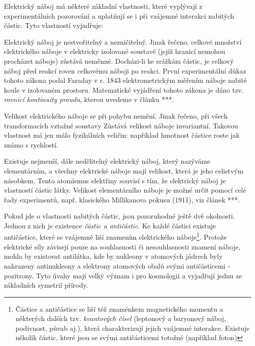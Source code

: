       Elektrický náboj má některé základní vlastnosti, které vyplývají z experimentálních pozorování
      a uplatňují se i při vzájemné interakci nabitých částic. Tyto vlastností vyjadřuje:    
      \begin{description}[leftmargin=2em,labelindent=1em, style=nextline]
        \item[Zákon zachování náboje] Elektrický náboj je nestvořitelný a nezničitelný. Jinak
              řečeno, celkové množství elektrického náboje v elektricky izolované soustavě (jejíž
              hranicí nemohou procházet náboje) zůstává neměnné. Docházi-li ke srážkám částic, je
              celkový náboj před reakcí roven celkovému náboji po reakci. První experimentální důkaz
              tohoto zákona podal Faraday v r. 1843 elektrometrickým měřením náboje nabité koule v
              izolovaném prostoru. Matematické vyjádření tohoto zákona je dáno tzv. \emph{rovnicí
              kontinuity proudu}, kterou uvedeme v článku ***. %
        \item[Zákon invariantnosti náboje] Velikost elektrického náboje se při pohybu nemění. Jinak
              řečeno, při všech transformacích vztažné soustavy Zůstává velikost náboje invariantní.
              Takovou vlastnost má jen málo fyzikálních veličin: například hmotnost částice roste
              jak známo s rychlostí.
        \item[Zákon kvantování náboje] Existuje nejmenší, dále nedělitelný elektrický náboj, který
              nazýváme elementárním, a všechny elektrické náboje mají velikost, která je jeho
              celistvým násobkem. Tento atomismus elektřiny souvisí s tím, že elektrický náboj je
              vlastností částic látky. Velikost elementárního náboje je možné určit pomocí celé řady
              experimentů, např. klasického Millikanova pokusu (1911), viz článek ***. %
      \end{description}

      Pokud jde o vlastnosti nabitých částic, jsou pozoruhodné ještě dvě okolnosti. Jednou z nich je
      existence \emph{částic a antičástic}. Ke každé částici existuje antičástice, které se vzájemně
      liší znamením elektrického náboje\footnote{Částice a antičástice se liší též znaménkem
      magnetického momentu a některých dalších tzv. \emph{kvantových čísel} (leptonový a  baryonový
      náboj, podivnost, půvab aj.), která charakterizují jejich vzájemné interakce. Existuje několik
      částic, které jsou se svými antičásticemi totožné (například foton)}. Protože elektrické síly
      závisejí pouze na souhlasnosti či nesouhlasnosti znamení náboje, mohla by existovat antilátka,
      kde by nukleony v atomových jádrech byly nahrazeny antinukleony a elektrony atomových obalů
      svými antičásticemi - pozitrony. Tyto úvahy mají velký význam i pro kosmologii a vyjadřují
      jednu ze základních symetrií přírody.
      
